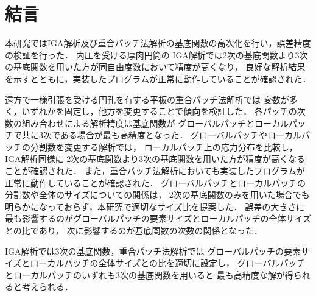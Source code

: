 \chapter{結言}
本研究ではIGA解析及び重合パッチ法解析の基底関数の高次化を行い，誤差精度の検証を行った．
内圧を受ける厚肉円筒の
IGA解析では2次の基底関数より3次の基底関数を用いた方が同自由度数において精度が高くなり，
良好な解析結果を示すとともに，実装したプログラムが正常に動作していることが確認された．

遠方で一様引張を受ける円孔を有する平板の重合パッチ法解析では
変数が多く，いずれかを固定し，他方を変更することで傾向を検証した．
各パッチの次数の組み合わせによる解析精度は基底関数が
グローバルパッチとローカルパッチで共に3次である場合が最も高精度となった．
グローバルパッチやローカルパッチの分割数を変更する解析では，
ローカルパッチ上の応力分布を比較し，IGA解析同様に
2次の基底関数より3次の基底関数を用いた方が精度が高くなることが確認された．
また，重合パッチ法解析においても実装したプログラムが正常に動作していることが確認された．
グローバルパッチとローカルパッチの分割数や全体のサイズについての関係は，
2次の基底関数のみを用いた場合でも明らかになっておらず，本研究で適切なサイズ比を提案した．
誤差の大きさに最も影響するのがグローバルパッチの要素サイズとローカルパッチの全体サイズとの比であり，
次に影響するのが基底関数の次数の関係となった．

IGA解析では3次の基底関数，重合パッチ法解析では
グローバルパッチの要素サイズとローカルパッチの全体サイズとの比を適切に設定し，
グローバルパッチとローカルパッチのいずれも3次の基底関数を用いると
最も高精度な解が得られると考えられる．